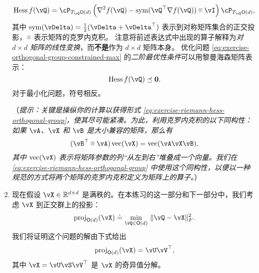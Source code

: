 \documentclass[../../book-main_zh.tex]{subfiles}
\begin{document}
\begin{exercise}
\begin{enumerate}
\begin{equation}
            \mathrm{Hess}\, f(\vQ) = \cP_{T_{\vQ}\O(d)} \left( 
            \nabla^2 f(\vQ) - \Symm(\vQ^\top \nabla f(\vQ)) \kron \vI
            \right) \cP_{T_{\vQ}\O(d)},
        \end{equation}
        其中 $\Symm(\vDelta) = \tfrac{1}{2}(\vDelta + \vDelta^\top)$ 表示到对称矩阵集合的正交投影，$\kron$ 表示矩阵的克罗内克积。
        注意将前述表达式中出现的算子解释为\textit{对 ${d \times d}$ 矩阵的线性变换}，而\textbf{不是}作为 $d \times d$ 矩阵本身。
        优化问题 \eqref{eq:exercise-orthogonal-group-constrained-max} 的\textit{二阶最优性条件}可以用黎曼海森矩阵表示：
        \begin{equation*}
            \mathrm{Hess}\, f(\vQ) \preceq \mathbf{0}.
        \end{equation*}
        对于最小化问题，符号相反。

        （\textit{提示：关键是操纵你的计算以获得形式 \eqref{eq:exercise-riemann-hess-orthogonal-group}，使其尽可能紧凑。为此，利用克罗内克积的以下同构性：如果 $\vA$、$\vX$ 和 $\vB$ 是大小兼容的矩阵，那么有
        \begin{equation*}
            (\vB^\top \kron \vA) \Vec(\vX) = \Vec(\vA \vX \vB),
        \end{equation*}
        其中 $\Vec(\vX)$ 表示将矩阵参数的列“从左到右”堆叠成一个向量。我们在 \eqref{eq:exercise-riemann-hess-orthogonal-group} 中使用这个同构性，以便以一种规范的方式将两个矩阵的克罗内克积定义为矩阵上的算子。}）
        
        \item 现在假设 $\vX \in \R^{d\times d}$ 是满秩的。在本练习的这一部分和下一部分中，我们考虑 $\vX$ 到正交群上的投影：
        \begin{equation}\label{eq:projection-onto-ogrp-defn}
            \mathrm{proj}_{\O(d)}(\vX) \doteq
            \min_{\vQ \in \O(d)
            }\, \norm{\vQ - \vX}_F^2.
        \end{equation}
        我们将证明这个问题的解由下式给出
        \begin{equation*}
            \mathrm{proj}_{\O(d)}(\vX)
            =
            \vU \vV^\top,
        \end{equation*}
        其中 $\vX = \vU \vS \vV^\top$ 是 $\vX$ 的奇异值分解。


\end{enumerate}
\end{exercise}
\end{document}
